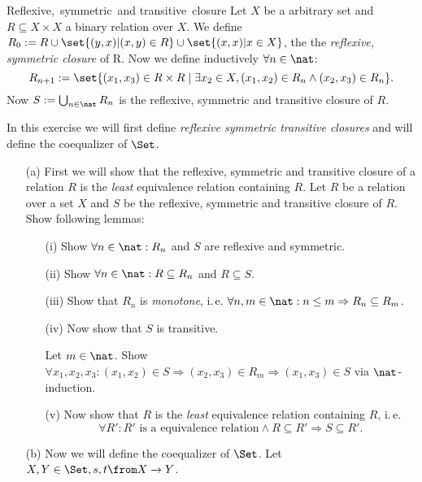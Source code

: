 \begin{definition}{Reflexive,\ symmetric\ and transitive\ closure}
  Let $X$ be a arbitrary set and $R \subseteq X \times X$ a binary relation over $X$.
  We define $R_0 := R \cup \set{ (y, x) | (x, y) \in R} \cup \set{ (x, x) | x \in X}$,
  the the \emph{reflexive, symmetric closure} of R.
  Now we define inductively $\forall n \in \nat$:
  \[R_{n+1} := \set{(x_1, x_3) \in R \times R \; | \; \exists x_2 \in X, (x_1, x_2) \in R_n \land (x_2, x_3) \in R_n}.\]
  Now $S := \bigcup_{n \in \nat}{R_n}$ is the reflexive, symmetric and transitive closure of $R$.
\end{definition}

\begin{exercise}
  In this exercise we will first define \emph{reflexive symmetric transitive closures} and will define the coequalizer of $\Set$.
  \begin{itemize}
    \item[(a)]First we will show that the reflexive, symmetric and transitive closure of a relation $R$ is the \emph{least} equivalence relation containing $R$.
      Let $R$ be a relation over a set $X$ and $S$ be the reflexive, symmetric and transitive closure of $R$. Show following lemmas:
      \begin{itemize}
        \item[(i)]Show $\forall n\in\nat: R_n$ and $S$ are reflexive and symmetric.
        \item[(ii)]Show $\forall n\in\nat: R \subseteq R_n$ and $R \subseteq S$.
        \item[(iii)]Show that $R_n$ is \emph{monotone}, i.\,e. $\forall n,m\in\nat: n\le m \Rightarrow R_n \subseteq R_m$.
        \item[(iv)]Now show that $S$ is transitive.
          \begin{hint}
            Let $m\in\nat$. Show $\forall x_1, x_2, x_3: (x_1, x_2) \in S \Rightarrow (x_2, x_3) \in R_m \Rightarrow (x_1, x_3) \in S$ via $\nat$-induction.
          \end{hint}
        \item[(v)]Now show that $R$ is the \emph{least} equivalence relation containing $R$, i.\,e.
          $$\forall R': \text{$R'$ is a equivalence relation} \land R \subseteq R' \Rightarrow S \subseteq R'.$$
      \end{itemize}
    \item[(b)]Now we will define the coequalizer of $\Set$.
      Let $X, Y \in \Set, s, t \from X \to Y$.

\end{itemize}
\end{exercise}

